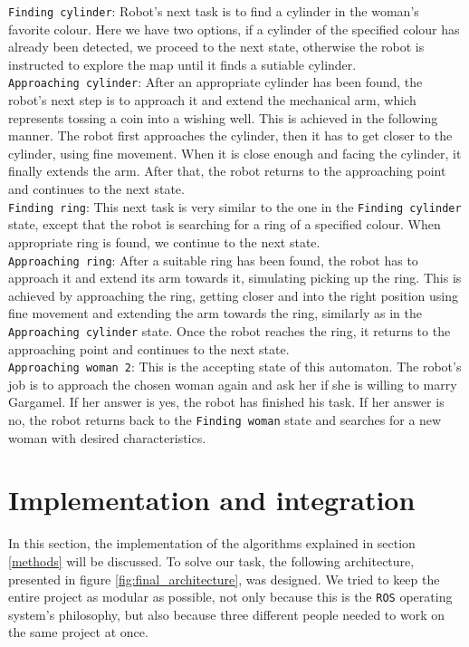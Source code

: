 \documentclass[12pt,a4paper]{article}
\begin{document}
	\texttt{Finding cylinder}: Robot's next task is to find a cylinder in the woman's favorite colour. Here we have two options, if a cylinder of the specified colour has already been detected, we proceed to the next state, otherwise the robot is instructed to explore the map until it finds a sutiable cylinder. \\

	\texttt{Approaching cylinder}: After an appropriate cylinder has been found, the robot's next step is to approach it and extend the mechanical arm, which represents tossing a coin into a wishing well. This is achieved in the following manner. The robot first approaches the cylinder, then it has to get closer to the cylinder, using fine movement. When it is close enough and facing the cylinder, it finally extends the arm. After that, the robot returns to the approaching point and continues to the next state. \\

	\texttt{Finding ring}: This next task is very similar to the one in the \texttt{Finding cylinder} state, except that the robot is searching for a ring of a specified colour. When appropriate ring is found, we continue to the next state. \\

	\texttt{Approaching ring}: After a suitable ring has been found, the robot has to approach it and extend its arm towards it, simulating picking up the ring. This is achieved by approaching the ring, getting closer and into the right position using fine movement and extending the arm towards the ring, similarly as in the \texttt{Approaching cylinder} state. Once the robot reaches the ring, it returns to the approaching point and continues to the next state. \\

	\texttt{Approaching woman 2}: This is the accepting state of this automaton. The robot's job is to approach the chosen woman again and ask her if she is willing to marry Gargamel. If her answer is yes, the robot has finished his task. If her answer is no, the robot returns back to the \texttt{Finding woman} state and searches for a new woman with desired characteristics. \\
	
	\section{Implementation and integration}
	In this section, the implementation of the algorithms explained in section \ref{methods} will be discussed. To solve our task, the following architecture, presented in figure \ref{fig:final_architecture}, was designed. We tried to keep the entire project as modular as possible, not only because this is the \texttt{ROS} operating system's philosophy, but also because three different people needed to work on the same project at once. \\
	
\end{document}
